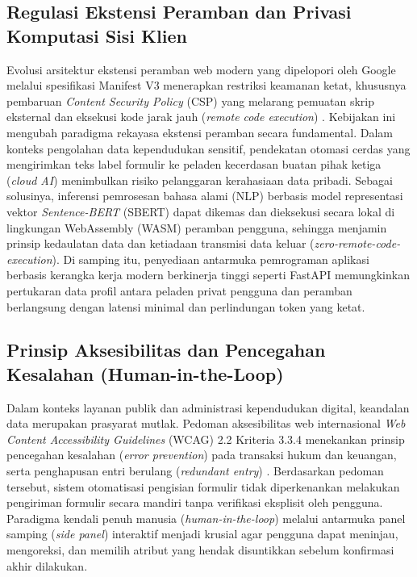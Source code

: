\documentclass[conference]{IEEEtran}
\begin{document}
\subsection{Regulasi Ekstensi Peramban dan Privasi Komputasi Sisi Klien}
Evolusi arsitektur ekstensi peramban web modern yang dipelopori oleh Google melalui spesifikasi Manifest V3 menerapkan restriksi keamanan ketat, khususnya pembaruan \textit{Content Security Policy} (CSP) yang melarang pemuatan skrip eksternal dan eksekusi kode jarak jauh (\textit{remote code execution}) \cite{W3C2024WebExtensions}. Kebijakan ini mengubah paradigma rekayasa ekstensi peramban secara fundamental. Dalam konteks pengolahan data kependudukan sensitif, pendekatan otomasi cerdas yang mengirimkan teks label formulir ke peladen kecerdasan buatan pihak ketiga (\textit{cloud AI}) menimbulkan risiko pelanggaran kerahasiaan data pribadi. Sebagai solusinya, inferensi pemrosesan bahasa alami (NLP) berbasis model representasi vektor \textit{Sentence-BERT} (SBERT) \cite{Reimers2019} dapat dikemas dan dieksekusi secara lokal di lingkungan WebAssembly (WASM) peramban pengguna, sehingga menjamin prinsip kedaulatan data dan ketiadaan transmisi data keluar (\textit{zero-remote-code-execution}). Di samping itu, penyediaan antarmuka pemrograman aplikasi berbasis kerangka kerja modern berkinerja tinggi seperti FastAPI \cite{Ramirez2023FastAPI} memungkinkan pertukaran data profil antara peladen privat pengguna dan peramban berlangsung dengan latensi minimal dan perlindungan token yang ketat.

\subsection{Prinsip Aksesibilitas dan Pencegahan Kesalahan (Human-in-the-Loop)}
Dalam konteks layanan publik dan administrasi kependudukan digital, keandalan data merupakan prasyarat mutlak. Pedoman aksesibilitas web internasional \textit{Web Content Accessibility Guidelines} (WCAG) 2.2 Kriteria 3.3.4 menekankan prinsip pencegahan kesalahan (\textit{error prevention}) pada transaksi hukum dan keuangan, serta penghapusan entri berulang (\textit{redundant entry}) \cite{W3C2023WCAG}. Berdasarkan pedoman tersebut, sistem otomatisasi pengisian formulir tidak diperkenankan melakukan pengiriman formulir secara mandiri tanpa verifikasi eksplisit oleh pengguna. Paradigma kendali penuh manusia (\textit{human-in-the-loop}) melalui antarmuka panel samping (\textit{side panel}) interaktif menjadi krusial agar pengguna dapat meninjau, mengoreksi, dan memilih atribut yang hendak disuntikkan sebelum konfirmasi akhir dilakukan.
\end{document}
